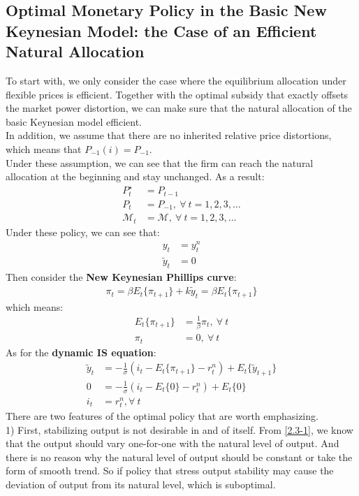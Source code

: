 \documentclass{article}
\numberwithin{equation}{section}
\begin{document}
\subsection{Optimal Monetary Policy in the Basic New Keynesian Model: the Case of an Efficient Natural Allocation}
To start with, we only consider the case where the equilibrium allocation under flexible prices is efficient. Together with the optimal subsidy that exactly offsets the market power distortion, we can make sure that the natural allocation of the basic Keynesian model efficient.\\
In addition, we assume that there are no inherited relative price distortions, which means that $P_{-1}(i) = P_{-1}$.\\
 Under these assumption, we can see that the firm can reach the natural allocation at the beginning and stay unchanged. As a result:
	\begin{align*}
		P^\star_t &= P_{t-1}\\
		P_t &= P_{-1},\ \forall\ t = 1, 2, 3, \ldots\\
		\mathscr{M}_t &= \mathscr{M},\ \forall\ t = 1, 2, 3, \ldots
	\end{align*} 
Under these policy, we can see that:
	\begin{align}
		y_t &= y^n_t \label{2.3-1}\\
		\tilde{y}_t &= 0 \nonumber
	\end{align}
Then consider the \textbf{New Keynesian Phillips curve}:
	\begin{align*}
		\pi_t = \beta E_t\{\pi_{t+1}\} + k \tilde{y}_t = \beta E_t\{\pi_{t+1}\}
	\end{align*}
which means:
	\begin{align}
		E_t\{\pi_{t+1}\} &= \frac{1}{\beta} \pi_t,\ \forall\ t \nonumber\\
		\pi_t &= 0,\ \forall\ t \label{2.3-2}
	\end{align}
As for the \textbf{dynamic IS equation}:
	\begin{align}
		\tilde{y}_t &= -\frac{1}{\sigma}(i_t - E_t\{\pi_{t+1}\} - r^n_t) + E_t \{\tilde{y}_{t+1}\} \nonumber\\
		0 &= -\frac{1}{\sigma}(i_t - E_t\{0\} - r^n_t) + E_t \{0\} \nonumber\\
		i_t &= r^n_t, \forall\ t \label{2.3-3}
	\end{align}
There are two features of the optimal policy that are worth emphasizing.\\
1) First, stabilizing output is not desirable in and of itself. From \eqref{2.3-1}, we know that the output should vary one-for-one with the natural level of output. And there is no reason why the natural level of output should be constant or take the form of smooth trend. So if policy that stress output stability may cause the deviation of output from its natural level, which is suboptimal.\\
\end{document}
